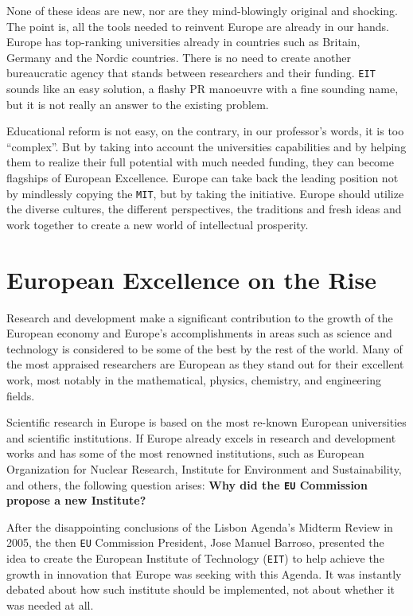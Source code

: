 \documentclass[11pt,a4paper,oneside,twocolumn]{IEEEtran}
\begin{document}
None of these ideas are new, nor are they mind-blowingly original and shocking. The point is, all the tools needed to reinvent Europe are already in our hands. Europe has top-ranking universities already in countries such as Britain, Germany and the Nordic countries\cite{5_2}. There is no need to create another bureaucratic agency that stands between researchers and their funding. \texttt{EIT} sounds like an easy solution, a flashy PR manoeuvre with a fine sounding name, but it is not really an answer to the existing problem.

Educational reform is not easy, on the contrary, in our professor's words, it is too ``complex''. But by taking into account the universities capabilities and by helping them to realize their full potential with much needed funding, they can become flagships of European Excellence.
Europe can take back the leading position not by mindlessly copying the \texttt{MIT}, but by taking the initiative. Europe should utilize the diverse cultures, the different perspectives, the traditions and fresh ideas and work together to create a new world of intellectual prosperity.

\section{European Excellence on the Rise}
Research and development make a significant contribution to the growth of the European economy and Europe's accomplishments in areas such as science and technology is considered to be some of the best by the rest of the world. Many of the most appraised researchers are European as they stand out for their excellent work, most notably in the mathematical, physics, chemistry, and engineering fields.

Scientific research in Europe is based on the most re-known European universities and scientific institutions. If Europe already excels in research and development works and has some of the most renowned institutions, such as European Organization for Nuclear Research, Institute for Environment and Sustainability, and others, the following question arises: \textbf{Why did the \texttt{EU} Commission propose a new Institute?}

After the disappointing conclusions of the Lisbon Agenda's Midterm Review in 2005, the then \texttt{EU} Commission President, Jose Manuel Barroso, presented the idea to create the European Institute of Technology (\texttt{EIT}) to help achieve the growth in innovation that Europe was seeking with this Agenda. It was instantly debated about how such institute should be implemented, not about whether it was needed at all.
\end{document}
